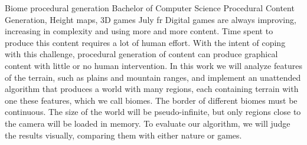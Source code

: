 \documentclass[tg]{mdtuffs}
\begin{document}
\begin{englishabstract}
{Biome procedural generation}
{Bachelor of Computer Science}
{Procedural Content Generation, Height maps, 3D games}
{July}
{fr}
Digital games are always improving, increasing in complexity and using more and more content.
Time spent to produce this content requires a lot of human effort.
With the intent of coping with this challenge, procedural generation of content can produce graphical content with little or no human intervention.
In this work we will analyze features of the terrain, such as plains and mountain ranges, and 
implement an unattended algorithm that produces a world with many regions, each containing terrain with one these features, which we call biomes. 
The border of different biomes must be continuous. 
The size of the world will be pseudo-infinite, but only regions close to the camera will be loaded in memory.
To evaluate our algorithm, we will judge the results visually, comparing them with either nature or games.

\end{englishabstract}


\listoffigures



\end{document}
